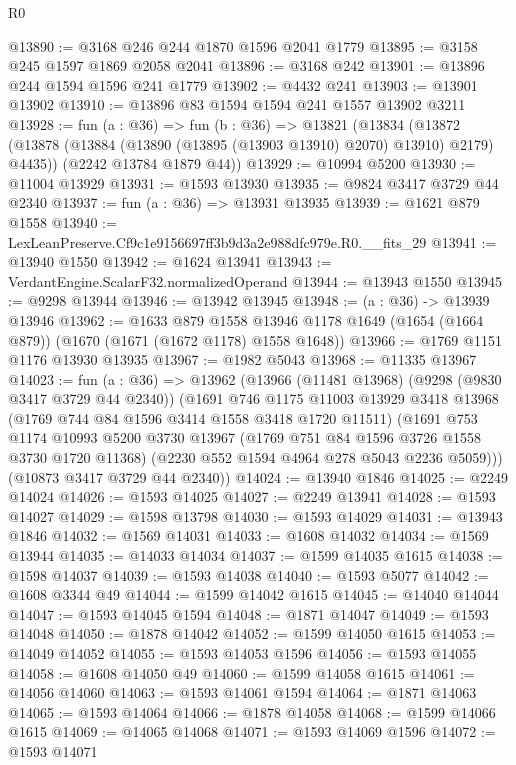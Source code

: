 \begin{lexlean}{R0}
\begin{coremodule}
@13890 := @3168 @246 @244 @1870 @1596 @2041 @1779
@13895 := @3158 @245 @1597 @1869 @2058 @2041
@13896 := @3168 @242
@13901 := @13896 @244 @1594 @1596 @241 @1779
@13902 := @4432 @241
@13903 := @13901 @13902
@13910 := @13896 @83 @1594 @1594 @241 @1557 @13902 @3211
@13928 := fun (a : @36) =>
  fun (b : @36) =>
  @13821
    (@13834
      (@13872 (@13878 (@13884 (@13890 (@13895 (@13903 @13910) @2070) @13910) @2179) @4435))
      (@2242 @13784 @1879 @44))
@13929 := @10994 @5200
@13930 := @11004 @13929
@13931 := @1593 @13930
@13935 := @9824 @3417 @3729 @44 @2340
@13937 := fun (a : @36) => @13931 @13935
@13939 := @1621 @879 @1558
@13940 := LexLeanPreserve.Cf9c1e9156697ff3b9d3a2e988dfc979e.R0.__fits_29
@13941 := @13940 @1550
@13942 := @1624 @13941
@13943 := VerdantEngine.ScalarF32.normalizedOperand
@13944 := @13943 @1550
@13945 := @9298 @13944
@13946 := @13942 @13945
@13948 := (a : @36) -> @13939 @13946
@13962 := @1633
    @879
    @1558
    @13946
    @1178
    @1649
    (@1654 (@1664 @879))
    (@1670 (@1671 (@1672 @1178) @1558 @1648))
@13966 := @1769 @1151 @1176 @13930 @13935
@13967 := @1982 @5043
@13968 := @11335 @13967
@14023 := fun (a : @36) =>
  @13962
    (@13966
      (@11481 @13968)
      (@9298 (@9830 @3417 @3729 @44 @2340))
      (@1691
        @746
        @1175
        @11003
        @13929
        @3418
        @13968
        (@1769 @744 @84 @1596 @3414 @1558 @3418 @1720 @11511)
        (@1691
          @753
          @1174
          @10993
          @5200
          @3730
          @13967
          (@1769 @751 @84 @1596 @3726 @1558 @3730 @1720 @11368)
          (@2230 @552 @1594 @4964 @278 @5043 @2236 @5059)))
      (@10873 @3417 @3729 @44 @2340))
@14024 := @13940 @1846
@14025 := @2249 @14024
@14026 := @1593 @14025
@14027 := @2249 @13941
@14028 := @1593 @14027
@14029 := @1598 @13798
@14030 := @1593 @14029
@14031 := @13943 @1846
@14032 := @1569 @14031
@14033 := @1608 @14032
@14034 := @1569 @13944
@14035 := @14033 @14034
@14037 := @1599 @14035 @1615
@14038 := @1598 @14037
@14039 := @1593 @14038
@14040 := @1593 @5077
@14042 := @1608 @3344 @49
@14044 := @1599 @14042 @1615
@14045 := @14040 @14044
@14047 := @1593 @14045 @1594
@14048 := @1871 @14047
@14049 := @1593 @14048
@14050 := @1878 @14042
@14052 := @1599 @14050 @1615
@14053 := @14049 @14052
@14055 := @1593 @14053 @1596
@14056 := @1593 @14055
@14058 := @1608 @14050 @49
@14060 := @1599 @14058 @1615
@14061 := @14056 @14060
@14063 := @1593 @14061 @1594
@14064 := @1871 @14063
@14065 := @1593 @14064
@14066 := @1878 @14058
@14068 := @1599 @14066 @1615
@14069 := @14065 @14068
@14071 := @1593 @14069 @1596
@14072 := @1593 @14071

\end{coremodule}
\end{lexlean}
